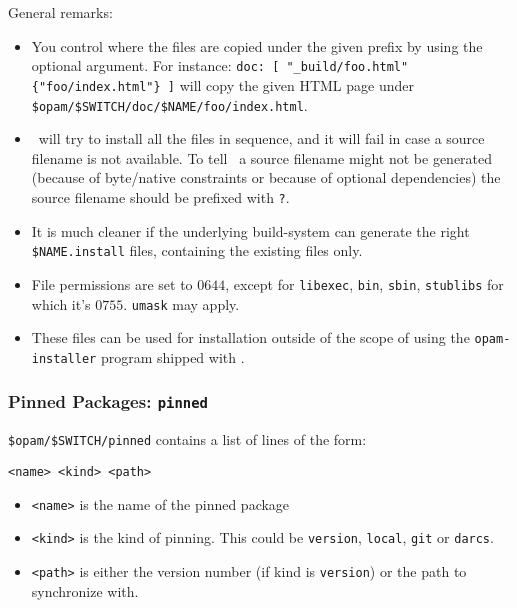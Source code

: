 \documentclass[a4paper,10pt]{article}
\begin{document}
General remarks:
\begin{itemize}

\item You control where the files are copied under the given prefix by
  using the optional argument. For instance:
  \verb+doc: [ "_build/foo.html" {"foo/index.html"} ]+ will copy the
  given HTML page under \verb+$opam/$SWITCH/doc/$NAME/foo/index.html+.

\item \OPAM\ will try to install all the files in sequence, and it will
  fail in case a source filename is not available. To tell \OPAM\ a
  source filename might not be generated (because of byte/native
  constraints or because of optional dependencies) the source filename
  should be prefixed with \verb+?+.

\item It is much cleaner if the underlying build-system can generate
  the right \verb+$NAME.install+ files, containing the existing files only.

\item File permissions are set to $0644$, except for {\tt libexec}, {\tt bin},
  {\tt sbin}, {\tt stublibs} for which it's $0755$. {\tt umask} may apply.

\item These files can be used for installation outside of the scope of \OPAM
  using the {\tt opam-installer} program shipped with \OPAM .

\end{itemize}

\subsubsection{Pinned Packages: {\tt pinned}}
\label{file:pinned}

\verb+$opam/$SWITCH/pinned+ contains a list of lines of the form:

\begin{Verbatim}
<name> <kind> <path>
\end{Verbatim}

\begin{itemize}
\item \verb+<name>+ is the name of the pinned package

\item \verb+<kind>+ is the kind of pinning. This could be \verb+version+,
\verb+local+, \verb+git+ or \verb+darcs+.

\item \verb+<path>+ is either the version number (if kind is
  \verb+version+) or the path to synchronize with.
\end{itemize}
\end{document}
